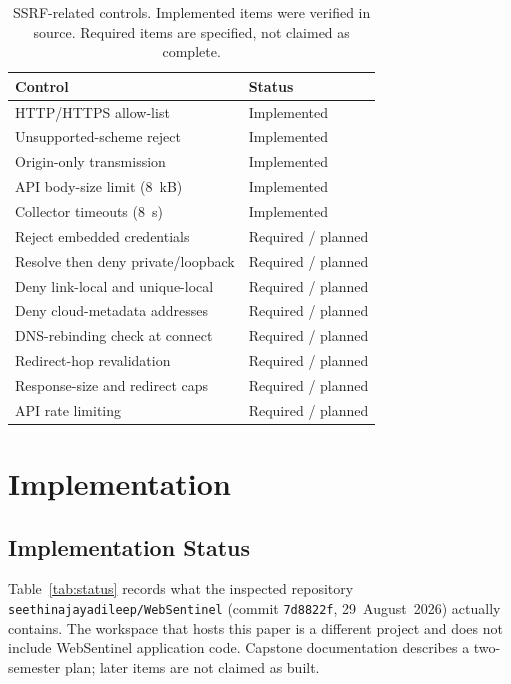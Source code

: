 \documentclass[conference]{IEEEtran}
\begin{document}
\begin{table}[!t]
\centering
\caption{SSRF-related controls. Implemented items were verified in source. Required items are specified, not claimed as complete.}
\label{tab:ssrf}
\renewcommand{\arraystretch}{1.08}
\begin{tabular}{>{\raggedright\arraybackslash}p{4.15cm}>{\raggedright\arraybackslash}p{3.55cm}}
\toprule
Control & Status \\
\midrule
HTTP/HTTPS allow-list & Implemented \\
Unsupported-scheme reject & Implemented \\
Origin-only transmission & Implemented \\
API body-size limit (8~kB) & Implemented \\
Collector timeouts (8~s) & Implemented \\
Reject embedded credentials & Required / planned \\
Resolve then deny private/loopback & Required / planned \\
Deny link-local and unique-local & Required / planned \\
Deny cloud-metadata addresses & Required / planned \\
DNS-rebinding check at connect & Required / planned \\
Redirect-hop revalidation & Required / planned \\
Response-size and redirect caps & Required / planned \\
API rate limiting & Required / planned \\
\bottomrule
\end{tabular}
\end{table}

\section{Implementation}
\label{sec:impl}

\subsection{Implementation Status}
Table~\ref{tab:status} records what the inspected repository \texttt{seethinajayadileep/WebSentinel} (commit \texttt{7d8822f}, 29~August~2026) actually contains. The workspace that hosts this paper is a different project and does not include WebSentinel application code. Capstone documentation describes a two-semester plan; later items are not claimed as built.
\end{document}
